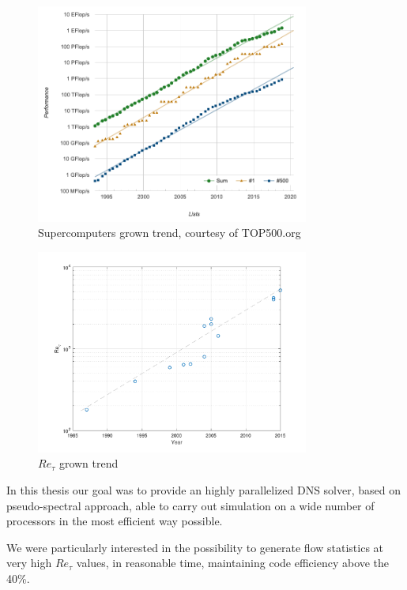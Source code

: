 \begin{figure}
\begin{center}
\includegraphics[width=0.8\textwidth]{grafici/top500hist}
\caption{Supercomputers grown trend, courtesy of TOP500.org}
\label{top500}
\end{center}
\end{figure}
\begin{figure}
\begin{center}
\includegraphics[width=0.8\textwidth]{grafici/dns_trend}
\caption{$Re_{\tau}$ grown trend}
\label{dns:trend}
\end{center}
\end{figure}



In this thesis our goal was to provide an highly parallelized DNS solver, based on pseudo-spectral approach, able to carry out simulation on a wide number of processors in the most efficient way possible. \par
We were particularly interested in the possibility to generate flow statistics at very high $Re_{\tau}$ values, in reasonable time, maintaining code efficiency above the 40\%. \\~\par

